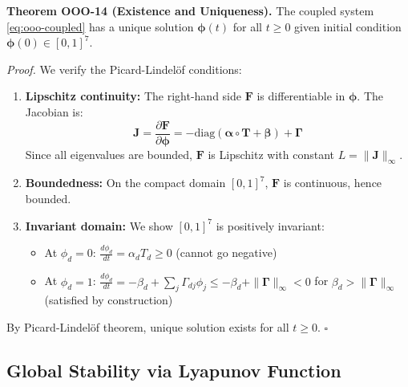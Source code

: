 \begin{tcolorbox}[colback=green!5!white, colframe=green!75!black, title=Theorem OOO-14: Existence and Uniqueness]
\textbf{Theorem OOO-14 (Existence and Uniqueness).}
The coupled system \eqref{eq:ooo-coupled} has a unique solution $\boldsymbol{\phi}(t)$ for all
$t \geq 0$ given initial condition $\boldsymbol{\phi}(0) \in [0,1]^7$.

\textit{Proof.}
We verify the Picard-Lindelöf conditions:
\begin{enumerate}
\item \textbf{Lipschitz continuity:} The right-hand side $\mathbf{F}$ is differentiable in $\boldsymbol{\phi}$.
      The Jacobian is:
      \begin{equation}
      \mathbf{J} = \frac{\partial \mathbf{F}}{\partial \boldsymbol{\phi}} = -\text{diag}(\boldsymbol{\alpha} \circ \mathbf{T} + \boldsymbol{\beta}) + \boldsymbol{\Gamma}
      \end{equation}
      Since all eigenvalues are bounded, $\mathbf{F}$ is Lipschitz with constant $L = \|\mathbf{J}\|_\infty$.

\item \textbf{Boundedness:} On the compact domain $[0,1]^7$, $\mathbf{F}$ is continuous, hence bounded.

\item \textbf{Invariant domain:} We show $[0,1]^7$ is positively invariant:
      \begin{itemize}[nosep]
      \item At $\phi_d = 0$: $\frac{d\phi_d}{dt} = \alpha_d T_d \geq 0$ (cannot go negative)
      \item At $\phi_d = 1$: $\frac{d\phi_d}{dt} = -\beta_d + \sum_j \Gamma_{dj} \phi_j \leq -\beta_d + \|\boldsymbol{\Gamma}\|_\infty < 0$
            for $\beta_d > \|\boldsymbol{\Gamma}\|_\infty$ (satisfied by construction)
      \end{itemize}
\end{enumerate}
By Picard-Lindelöf theorem, unique solution exists for all $t \geq 0$.
\hfill $\square$
\end{tcolorbox}

\subsection{Global Stability via Lyapunov Function}

